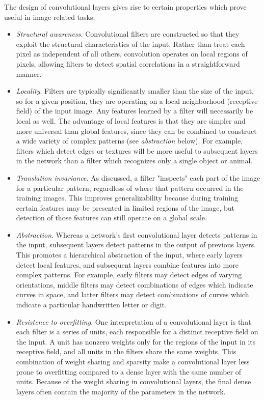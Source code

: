 The design of convolutional layers gives rise to certain properties which prove useful in image related tasks:
\begin{itemize}
	\item \emph{Structural awareness.}
	Convolutional filters are constructed so that they exploit the structural characteristics of the input.
 	Rather than treat each pixel as independent of all others, convolution operates on local regions of pixels, allowing filters to detect spatial correlations in a straightforward manner.
	\item \emph{Locality}. 
	Filters are typically significantly smaller than the size of the input, so for a given position, they are operating on a local neighborhood (receptive field) of the input image. 
	Any features learned by a filter will necessarily be local as well. 
 	The advantage of local features is that they are simpler and more universal than global features, since they can be combined to construct a wide variety of complex patterns (see \emph{abstraction} below).
	For example, filters which detect edges or textures will be more useful to subsequent layers in the network than a filter which recognizes only a single object or animal.
 	\item \emph{Translation invariance}. 
 	As discussed, a filter "inspects" each part of the image for a particular pattern, regardless of where that pattern occurred in the training images.
 	This improves generalizability because during training certain features may be presented in limited regions of the image, but detection of those features can still operate on a global scale.
 	\item \emph{Abstraction}. Whereas a network's first convolutional layer detects patterns in the input, subsequent layers detect patterns in the output of previous layers. 
 	This promotes a hierarchical abstraction of the input, where early layers detect local features, and subsequent layers combine features into more complex patterns.
 	For example, early filters may detect edges of varying orientations, middle filters may detect combinations of edges which indicate curves in space, and latter filters may detect combinations of curves which indicate a particular handwritten letter or digit.
 	\item \emph{Resistence to overfitting}.
 	One interpretation of a convolutional layer is that each filter is a series of units, each responsible for a distinct receptive field on the input.
 	A unit has nonzero weights only for the regions of the input in its receptive field, and all units in the filters share the same weights. 
 	This combination of weight sharing and sparsity make a convolutional layer less prone to overfitting compared to a dense layer with the same number of units.
 	Because of the weight sharing in convolutional layers, the final dense layers often contain the majority of the parameters in the network.
\end{itemize}

